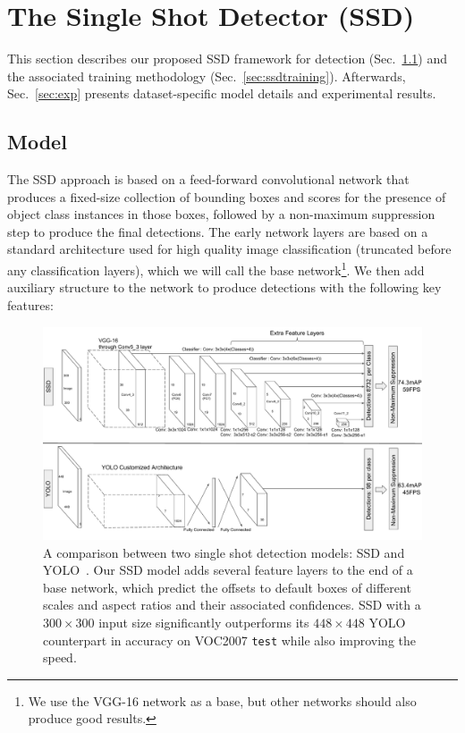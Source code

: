 \documentclass[runningheads]{llncs}
\begin{document}
\section{The Single Shot Detector (SSD)}
\label{sec:ssd}

This section describes our proposed SSD framework for detection (Sec.~\ref{sec:ssdmodel}) and the associated training methodology (Sec.~\ref{sec:ssdtraining}). Afterwards, Sec.~\ref{sec:exp} presents dataset-specific model details and experimental results.

\subsection{Model}
\label{sec:ssdmodel}

The SSD approach is based on a feed-forward convolutional network that produces a fixed-size collection of bounding boxes and scores for the presence of object class instances in those boxes, followed by a non-maximum suppression step to produce the final detections. The early network layers are based on a standard architecture used for high quality image classification (truncated before any classification layers), which we will call the base network\footnote{We use the VGG-16 network as a base, but other networks should also produce good results.}. We then add auxiliary structure to the network to produce detections with the following key features:

\begin{figure}
	\centering
	\includegraphics[width=0.8\linewidth]{figure/SSD_architecture.pdf}
    \caption{A comparison between two single shot detection models: SSD and YOLO~\cite{redmon2015you}. Our SSD model adds several feature layers to the end of a base network, which predict the offsets to default boxes of different scales and aspect ratios and their associated confidences. SSD with a $300\times 300$ input size significantly outperforms its $448\times 448$ YOLO counterpart in accuracy on VOC2007 \texttt{test} while also improving the speed.}
    \label{fig:architecture}
\end{figure}
\end{document}
